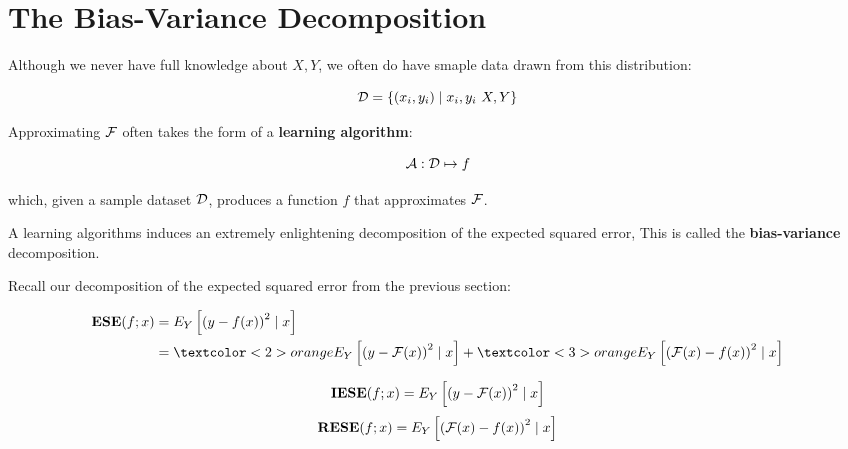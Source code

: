 \section{The Bias-Variance Decomposition}
%
%
\begin{frame}
  Although we never have full knowledge about $X, Y$, we often do have smaple
  data drawn from this distribution:

  $$ \operatorname*{\mathcal{D}} = \left\{ (x_i, y_i) \mid x_i, y_i ~ X, Y \right\} $$
\end{frame}
%
%
\begin{frame}
  Approximating $\operatorname*{\mathcal{F}}$ often takes the form of a \textbf{learning algorithm}:

  $$ \operatorname*{\mathcal{A}} : \operatorname*{\mathcal{D}} \mapsto f $$

  which, given a sample dataset $\operatorname*{\mathcal{D}}$, produces a function $f$ that approximates
  $\operatorname*{\mathcal{F}}$.
\end{frame}
%
%
\begin{frame}
  A learning algorithms induces an extremely enlightening decomposition of the
  expected squared error, This is called the \textbf{bias-variance}
  decomposition.
\end{frame}
%
%
\begin{frame}

  Recall our decomposition of the expected squared error from the previous
  section:

  \begin{align*}
    \ESE(f; x) & = E_Y \left[ \left( y - f(x) \right)^2 \mid x \right] \\
      & = \textcolor<2>{orange}{
        E_Y \left[ \left( y - \F(x) \right)^2 \mid x \right]
      } 
      + \textcolor<3>{orange}{
        E_Y \left[ \left( \F(x) - f(x) \right)^2 \mid x \right]
      }
  \end{align*}


\end{frame}
%
%
\begin{frame}
  $$ \operatorname*{\mathbf{IESE}}(f; x) = E_Y \left[ \left( y - \operatorname*{\mathcal{F}}(x) \right)^2 \mid x \right] $$
  $$ \operatorname*{\mathbf{RESE}}(f; x) = E_Y \left[ \left( \operatorname*{\mathcal{F}}(x) - f(x) \right)^2 \mid x \right] $$
\end{frame}
